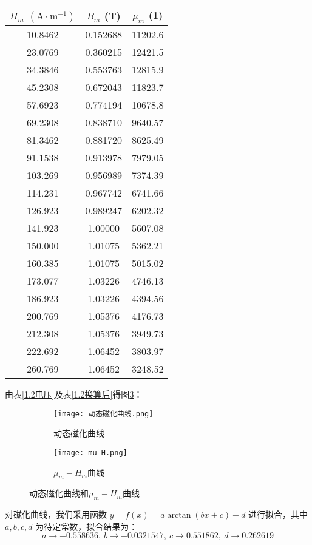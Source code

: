 \documentclass[11pt]{article}
\begin{document}
\begin{center}
\begin{minipage}{0.4\columnwidth}
\begin{table}[H]
				\begin{tabular}{ccc}\toprule
					$H_m$ $\mathrm{(A\cdot m^{-1})}$ & $B_m$ (T) & $\mu_m$ (1) \\
					\midrule
					10.8462  & 0.152688 & 11202.6 \\
					23.0769  & 0.360215 & 12421.5 \\
					34.3846  & 0.553763 & 12815.9 \\
					45.2308  & 0.672043 & 11823.7 \\
					57.6923  & 0.774194 & 10678.8 \\
					69.2308  & 0.838710 & 9640.57 \\
					81.3462  & 0.881720 & 8625.49 \\
					91.1538  & 0.913978 & 7979.05 \\
					103.269  & 0.956989 & 7374.39 \\
					114.231  & 0.967742 & 6741.66 \\
					126.923  & 0.989247 & 6202.32 \\
					141.923  & 1.00000 & 5607.08 \\
					150.000  & 1.01075  & 5362.21 \\
					160.385  & 1.01075  & 5015.02 \\
					173.077  & 1.03226  & 4746.13 \\
					186.923  & 1.03226  & 4394.56 \\
					200.769  & 1.05376  & 4176.73 \\
					212.308  & 1.05376  & 3949.73 \\
					222.692  & 1.06452  & 3803.97 \\
					260.769  & 1.06452  & 3248.52 \\
					\bottomrule
				\end{tabular}
			\end{table}
		\end{minipage}
	\end{center}
	由表\ref{1.2电压}及表\ref{1.2换算后}得图\ref{fig:c}：
	\begin{figure}[H]
		\centering
		\begin{subfigure}[t]{0.45\textwidth}  %
			\centering
			\texttt{[image: 动态磁化曲线.png]}  %
			\caption{动态磁化曲线}
			\label{fig:动态磁化曲线}
		\end{subfigure}
		\begin{subfigure}[t]{0.45\textwidth}  %
			\centering
			\texttt{[image: mu-H.png]}  %
			\caption{$\mu_m-H_m$曲线}
			\label{fig:mu-H}
		\end{subfigure}
		\caption{动态磁化曲线和$\mu_m-H_m$曲线}
		\label{fig:c}
	\end{figure}
	对磁化曲线，我们采用函数 $y = f(x) = a \arctan (b x + c) + d$ 进行拟合，其中 $a, b, c, d$ 为待定常数，拟合结果为：
	\[a \rightarrow -0.558636,\ b \rightarrow -0.0321547,\ c \rightarrow 0.551862,\ d \rightarrow 0.262619\]
	
\end{document}
